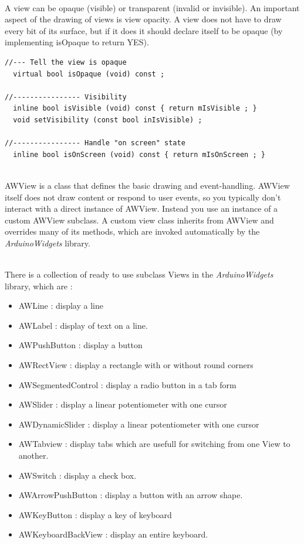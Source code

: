 \documentclass[a4paper,11pt]{extarticle}
\begin{document}
~\\ A view can be opaque (visible) or transparent (invalid or invisible). An important aspect of the drawing of views is view opacity. A view does not have to draw every bit of its surface, but if it does it should declare itself to be opaque (by implementing isOpaque to return YES).

\begin{lstlisting}[language=Arduinonl]
//--- Tell the view is opaque
  virtual bool isOpaque (void) const ;

//---------------- Visibility
  inline bool isVisible (void) const { return mIsVisible ; }
  void setVisibility (const bool inIsVisible) ;

//---------------- Handle "on screen" state
  inline bool isOnScreen (void) const { return mIsOnScreen ; }
\end{lstlisting}


~\\ AWView is a class that defines the basic drawing and event-handling. AWView itself does not draw content or respond to user events, so you typically don’t interact with a direct instance of AWView. Instead you use an instance of a custom AWView subclass. A custom view class inherits from AWView and overrides many of its methods, which are invoked automatically by the \emph{ArduinoWidgets} library.

~\\ There is a collection of ready to use subclass Views in the \emph{ArduinoWidgets} library, which are :
\begin{itemize}
\item AWLine : display a line
\item AWLabel : display of text on a line.
\item AWPushButton : display a button
\item AWRectView : display a rectangle with or without round corners
\item AWSegmentedControl : display a radio button in a tab form
\item AWSlider : display a linear potentiometer with one cursor
\item AWDynamicSlider : display a linear potentiometer with one cursor
\item AWTabview : display tabs which are usefull for switching from one View to another. 
\item AWSwitch : display a check box. 
\item AWArrowPushButton : display a button with an arrow shape. 
\item AWKeyButton : display a key of keyboard 
\item AWKeyboardBackView : display an entire keyboard. 
\end{itemize}
\end{document}
